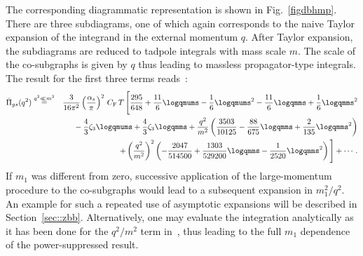 The corresponding diagrammatic representation
is shown in Fig.~\ref{figdbhmp}. There are three subdiagrams, one of
which again corresponds to the naive Taylor expansion of the integrand
in the external momentum $q$.
After Taylor expansion, the subdiagrams are reduced to tadpole
integrals with mass scale $m$. The scale of the co-subgraphs is given
by $q$ thus leading to massless propagator-type integrals.
The result for the first three terms reads~\cite{Stediss}:
\begin{eqnarray}
\bar{\Pi}_{gs}(q^2) &\stackrel{q^2\ll m^2}{=}&
   \frac{3}{16\pi^2}
  \left({\alpha_s\over \pi}\right)^2\,C_{\rm F}\,T\,\Bigg[
        \frac{295}{648} 
      + \frac{11}{6}\logqmums
      - \frac{1}{6}\logqmums^2
      - \frac{11}{6}\logqmms 
      + \frac{1}{6}\logqmms^2
\nonumber\\
&&\mbox{}
      - \frac{4}{3}\zeta_3\logqmums 
      + \frac{4}{3}\zeta_3\logqmms
      + \frac{q^2}{m^2}\left(
         \frac{3503}{10125} 
       - \frac{88}{675}\logqmms
       + \frac{2}{135}\logqmms^2
                       \right)
\nonumber\\
&&
       + \left(\frac{q^2}{m^2}\right)^2\left(
        - \frac{2047}{514500} 
        + \frac{1303}{529200}\logqmms
        - \frac{1}{2520}\logqmms^2
                                        \right)
\Bigg] + \cdots\,.
\label{eqdbhmpres}
\end{eqnarray}
If $m_1$ was different from zero, successive application of the
large-momentum procedure to the co-subgraphs would lead to a subsequent
expansion in $m_1^2/q^2$. An example for such a repeated use of
asymptotic expansions will be described in Section~\ref{sec::zbb}.
Alternatively, one may evaluate the integration analytically as it has
been done for the $q^2/m^2$ term in~\cite{Sei:dipl}, thus leading to the
full $m_1$ dependence of the power-suppressed result.



